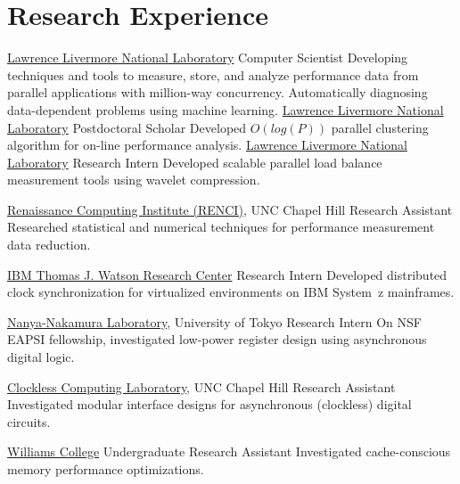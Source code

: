 \section{Research Experience}
		{\href{http://www.llnl.gov}{Lawrence Livermore National Laboratory}}
		{Computer Scientist}
		{}{}
		{Developing techniques and tools to measure, store, and analyze
		 performance data from parallel applications with million-way concurrency.
		 Automatically diagnosing data-dependent problems using machine learning.
	}
		{\href{http://www.llnl.gov}{Lawrence Livermore National Laboratory}}
		{Postdoctoral Scholar}
		{}{}
		{Developed $O(log(P))$ parallel clustering algorithm for on-line performance analysis.
		 }
		{\href{http://www.llnl.gov}{Lawrence Livermore National Laboratory}}
		{Research Intern}
		{}{}
		{Developed scalable parallel load balance measurement tools using wavelet compression.}

		{\href{http://www.renci.org}{Renaissance Computing Institute (RENCI)}, UNC Chapel Hill}
		{Research Assistant}
		{}{}
		{Researched statistical and numerical techniques for performance measurement data reduction.}

		{\href{http://www.watson.ibm.com}{IBM Thomas J. Watson Research Center}}
		{Research Intern}
		{}{}
		{Developed distributed clock synchronization for virtualized environments on IBM System~z mainframes.}

		{\href{http://www.hal.rcast.u-tokyo.ac.jp/}{Nanya-Nakamura Laboratory}, University of Tokyo}
		{Research Intern}
		{}{}
		{On NSF EAPSI fellowship, investigated low-power register design using asynchronous digital logic.}

		{\href{http://www.cs.unc.edu/~montek/}{Clockless Computing Laboratory}, UNC Chapel Hill}
		{Research Assistant}
		{}{}
		{Investigated modular interface designs for asynchronous (clockless) digital circuits.}

		{\href{http://www.williams.edu}{Williams College}}
		{Undergraduate Research Assistant}
		{}{}
		{Investigated cache-conscious memory performance optimizations.}

